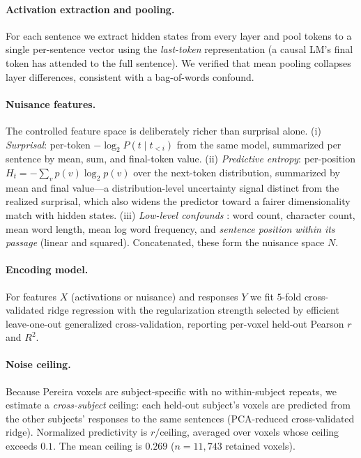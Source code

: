 \documentclass{article}
\begin{document}
\paragraph{Activation extraction and pooling.} For each sentence we extract hidden states from
every layer and pool tokens to a single per-sentence vector using the \emph{last-token}
representation (a causal LM's final token has attended to the full sentence). We verified that
mean pooling collapses layer differences, consistent with a bag-of-words confound.

\paragraph{Nuisance features.} The controlled feature space is deliberately richer than
surprisal alone. (i) \emph{Surprisal}: per-token $-\log_2 P(t \mid t_{<i})$ from the same
model, summarized per sentence by mean, sum, and final-token value. (ii) \emph{Predictive
entropy}: per-position $H_t=-\sum_v p(v)\log_2 p(v)$ over the next-token distribution,
summarized by mean and final value---a distribution-level uncertainty signal distinct from the
realized surprisal, which also widens the predictor toward a fairer dimensionality match with
hidden states. (iii) \emph{Low-level confounds} \citep{feghhi2024}: word count, character
count, mean word length, mean log word frequency, and \emph{sentence position within its
passage} (linear and squared). Concatenated, these form the nuisance space $N$.

\paragraph{Encoding model.} For features $X$ (activations or nuisance) and responses $Y$ we fit
$5$-fold cross-validated ridge regression with the regularization strength selected by efficient
leave-one-out generalized cross-validation, reporting per-voxel held-out Pearson $r$ and $R^2$.

\paragraph{Noise ceiling.} Because Pereira voxels are subject-specific with no within-subject
repeats, we estimate a \emph{cross-subject} ceiling: each held-out subject's voxels are
predicted from the other subjects' responses to the same sentences (PCA-reduced cross-validated
ridge). Normalized predictivity is $r / \text{ceiling}$, averaged over voxels whose ceiling
exceeds $0.1$. The mean ceiling is $0.269$ ($n=11{,}743$ retained voxels).
\end{document}
